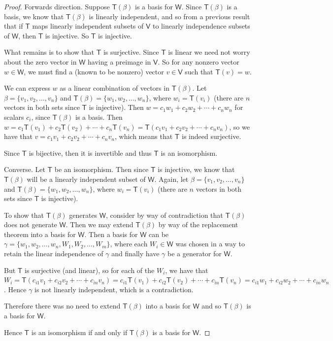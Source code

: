 \documentclass[11pt]{article}
\newcommand{\cbr}[1]{\{#1\}}
\begin{document}
\begin{proof}
    Forwards direction. Suppose $\mathsf{T}(\beta)$ is a basis for $\mathsf{W}$. Since $\mathsf{T}(\beta)$ is a basis, we know that $\mathsf{T}(\beta)$ is linearly independent, and so from a previous result that if $\mathsf{T}$ maps linearly independent subsets of $\mathsf{V}$ to linearly independence subsets of $\mathsf{W}$, then $\mathsf{T}$ is injective. So $\mathsf{T}$ is injective.

    What remains is to show that $\mathsf{T}$ is surjective. Since $\mathsf{T}$ is linear we need not worry about the zero vector in $\mathsf{W}$ having a preimage in $\mathsf{V}$. So for any nonzero vector $w\in\mathsf{W}$, we must find a (known to be nonzero) vector $v\in\mathsf{V}$ such that $\mathsf{T}(v) = w$.

    We can express $w$ as a linear combination of vectors in $\mathsf{T}(\beta)$. Let $\beta = \cbr{v_1,v_2,\dots,v_n}$ and $\mathsf{T}(\beta) = \cbr{w_1,w_2,\dots,w_n}$, where $w_i = \mathsf{T}(v_i)$ (there are $n$ vectors in both sets since $\mathsf{T}$ is injective). Then $w = c_1w_1 + c_2w_2 + \cdots + c_nw_n$ for scalars $c_i$, since $\mathsf{T}(\beta)$ is a basis. Then $w = c_1\mathsf{T}(v_1) + c_2\mathsf{T}(v_2) + \cdots + c_n\mathsf{T}(v_n) = \mathsf{T}(c_1v_1 + c_2v_2 + \cdots + c_nv_n)$, so we have that $v = c_1v_1 + c_2v_2 + \cdots + c_nv_n$, which means that $\mathsf{T}$ is indeed surjective.

    Since $\mathsf{T}$ is bijective, then it is invertible and thus $\mathsf{T}$ is an isomorphism.

    Converse. Let $\mathsf{T}$ be an isomorphism. Then since $\mathsf{T}$ is injective, we know that $\mathsf{T}(\beta)$ will be a linearly independent subset of $\mathsf{W}$. Again, let $\beta = \cbr{v_1,v_2,\dots,v_n}$ and $\mathsf{T}(\beta) = \cbr{w_1,w_2,\dots,w_n}$, where $w_i = \mathsf{T}(v_i)$ (there are $n$ vectors in both sets since $\mathsf{T}$ is injective).

    To show that $\mathsf{T}(\beta)$ generates $\mathsf{W}$, consider by way of contradiction that $\mathsf{T}(\beta)$ does not generate $\mathsf{W}$. Then we may extend $\mathsf{T}(\beta)$ by way of the replacement theorem into a basis for $\mathsf{W}$. Then a basis for $\mathsf{W}$ can be $\gamma = \cbr{w_1,w_2,\dots,w_n, W_1, W_2, \dots, W_m}$, where each $W_i\in\mathsf{W}$ was chosen in a way to retain the linear independence of $\gamma$ and finally have $\gamma$ be a generator for $\mathsf{W}$.

    But $\mathsf{T}$ is surjective (and linear), so for each of the $W_i$, we have that $W_i = \mathsf{T}(c_{i1}v_1 + c_{i2}v_2 + \cdots + c_{in}v_n) = c_{i1}\mathsf{T}(v_1) + c_{i2}\mathsf{T}(v_2) + \cdots + c_{in}\mathsf{T}(v_n) = c_{i1}w_1 + c_{i2}w_2 + \cdots + c_{in}w_n$. Hence $\gamma$ is not linearly independent, which is a contradiction. 
    
    Therefore there was no need to extend $\mathsf{T}(\beta)$ into a basis for $\mathsf{W}$ and so $\mathsf{T}(\beta)$ is a basis for $\mathsf{W}$.

    Hence $\mathsf{T}$ is an isomorphism if and only if $\mathsf{T}(\beta)$ is a basis for $\mathsf{W}$.
\end{proof}
\end{document}
